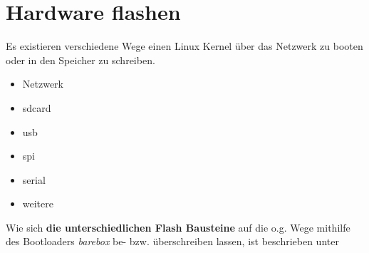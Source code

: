 
\chapter{Hardware flashen}%
\label{cha:hardware_flashen}

Es existieren verschiedene Wege einen Linux Kernel über das Netzwerk zu booten
oder in den Speicher zu schreiben.

\begin{itemize}
    \item Netzwerk
    \item sdcard
    \item usb
    \item spi
    \item serial
    \item weitere
\end{itemize}

Wie sich \textbf{die unterschiedlichen Flash Bausteine} auf die o.g. Wege
mithilfe des Bootloaders \textit{barebox} be- bzw. überschreiben lassen,
ist beschrieben unter \cite[Updating the Software]{Pytec:BSP_Manual}
















